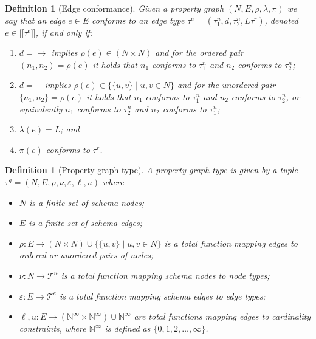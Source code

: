 \documentclass[a4paper]{article}
\newtheorem{definition}[theorem]{Definition}
\newcommand{\N}{\mathbb{N}}
\newcommand{\rtype}{\tau^r}
\newcommand{\ntype}{\tau^n}
\newcommand{\ntypes}{\mathcal{T}^n}
\newcommand{\etype}{\tau^e}
\newcommand{\etypes}{\mathcal{T}^e}
\newcommand{\gtype}{\tau^g}
\newcommand{\lsem}{\ensuremath{[\![}}
\newcommand{\rsem}{\ensuremath{]\!]}}
\newcommand{\sem}[1]{\ensuremath{\lsem #1 \rsem}}
\begin{document}
\begin{definition}[Edge conformance]
  Given a property graph $(N, E, \rho, \lambda, \pi)$ we say that an edge $e \in E$ \emph{conforms} to an edge type $\etype = (\ntype_1, d, \ntype_2, L\rtype)$, denoted $e \in \sem{\etype}$, if and only if:
  \begin{enumerate}
    \item $d = \rightarrow$ implies $\rho(e) \in (N \times N)$ and for the ordered pair $(n_1, n_2) = \rho(e)$ it holds that $n_1$ conforms to $\ntype_1$ and $n_2$ conforms to $\ntype_2$;
    \item $d = -$ implies $\rho(e) \in \{\{u, v\} \mid u, v \in N\}$ and for the unordered pair $\{n_1, n_2\} = \rho(e)$ it holds that $n_1$ conforms to $\ntype_1$ and $n_2$ conforms to $\ntype_2$, or equivalently $n_1$ conforms to $\ntype_2$ and $n_2$ conforms to $\ntype_1$;
    \item $\lambda(e) = L$; and
    \item $\pi(e)$ conforms to $\rtype$.
  \end{enumerate}
\end{definition}


\begin{definition}[Property graph type]
  A \emph{property graph type} is given by a tuple $\gtype = (N, E, \rho, \nu, \varepsilon, \ell, u)$ where 
  \begin{itemize}
    \item $N$ is a finite set of schema nodes;
    \item $E$ is a finite set of schema edges;
    \item $\rho : E \to (N \times N) \cup \{\{u, v\} \mid u, v \in N\}$ is a total function mapping edges to ordered or unordered pairs of nodes;
    \item $\nu : N \to \ntypes$ is a total function mapping schema nodes to node types;
    \item $\varepsilon : E \to \etypes$ is a total function mapping schema edges to edge types;
    \item $\ell, u : E \to (\N^\infty \times \N^\infty) \cup \N^\infty$ are total functions mapping edges to cardinality constraints, where $\N^\infty$ is defined as $\{0, 1, 2, \ldots, \infty\}$.
  \end{itemize}
\end{definition}

\end{document}

